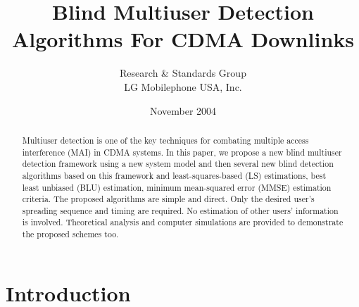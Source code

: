 \documentclass[a4paper,11pt,fleqn]{article}
\title{Blind Multiuser Detection Algorithms For CDMA Downlinks}
\author{Research \& Standards Group\\ LG Mobilephone USA, Inc.}
\date{November 2004}
\begin{document}
\maketitle

\pagebreak

\tableofcontents

\pagebreak

\listoffigures

\pagebreak


\begin{abstract}
Multiuser detection is one of the key techniques for combating
multiple access interference (MAI) in CDMA systems. In this paper,
we propose a new blind multiuser detection framework using a new
system model and then several new blind detection algorithms based
on this framework and least-squares-based (LS) estimations, best
least unbiased (BLU) estimation, minimum mean-squared error (MMSE)
estimation criteria. The proposed algorithms are simple and
direct. Only the desired user's spreading sequence and timing are
required. No estimation of other users' information is involved.
Theoretical analysis and computer simulations are provided to
demonstrate the proposed schemes too.
\end{abstract}

\pagebreak

\section{Introduction}
\end{document}
